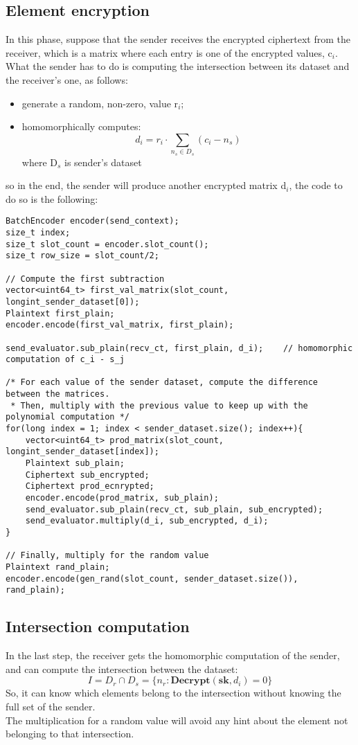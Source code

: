 \documentclass[10pt]{extarticle}
\begin{document}
\subsection{Element encryption}
In this phase, suppose that the sender receives the encrypted ciphertext from the receiver, which is a matrix where each entry is one of the encrypted values, c$_i$.\\What the sender has to do is computing the intersection between its dataset and the receiver's one, as follows:
\begin{itemize}
    \item generate a random, non-zero, value r$_i$;
    \item homomorphically computes:
        \begin{equation}
            d_i = r_i \cdot \sum\limits_{n_s \in D_s} (c_i - n_s) 
        \end{equation}
    where D$_s$ is sender's dataset
\end{itemize}
so in the end, the sender will produce another encrypted matrix d$_i$, the code to do so is the following:
\newpage
\begin{lstlisting}
BatchEncoder encoder(send_context);
size_t index;
size_t slot_count = encoder.slot_count();
size_t row_size = slot_count/2;

// Compute the first subtraction
vector<uint64_t> first_val_matrix(slot_count, longint_sender_dataset[0]);
Plaintext first_plain;
encoder.encode(first_val_matrix, first_plain);
		
send_evaluator.sub_plain(recv_ct, first_plain, d_i);	// homomorphic computation of c_i - s_j

/* For each value of the sender dataset, compute the difference between the matrices. 
 * Then, multiply with the previous value to keep up with the polynomial computation */
for(long index = 1; index < sender_dataset.size(); index++){
	vector<uint64_t> prod_matrix(slot_count, longint_sender_dataset[index]);
	Plaintext sub_plain;
	Ciphertext sub_encrypted; 
	Ciphertext prod_ecnrypted;
	encoder.encode(prod_matrix, sub_plain);
	send_evaluator.sub_plain(recv_ct, sub_plain, sub_encrypted);
	send_evaluator.multiply(d_i, sub_encrypted, d_i);
}
		
// Finally, multiply for the random value
Plaintext rand_plain;
encoder.encode(gen_rand(slot_count, sender_dataset.size()), rand_plain);	
\end{lstlisting}

\subsection{Intersection computation}
In the last step, the receiver gets the homomorphic computation of the sender, and can compute the intersection between the dataset:
\begin{equation}
    I = D_r \cap D_s = \{n_r: \textbf{Decrypt}(\textbf{sk}, d_i) = 0\}
\end{equation}
So, it can know which elements belong to the intersection without knowing the full set of the sender.\\
The multiplication for a random value will avoid any hint about the element not belonging to that intersection.
\end{document}
